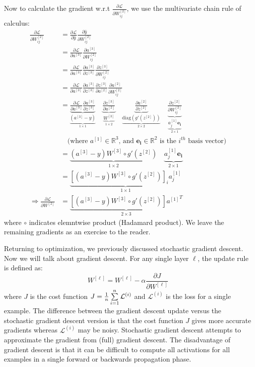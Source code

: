 \documentclass{article}
\numberwithin{equation}{section}
\begin{document}
Now to calculate the gradient w.r.t $\frac{\partial \mathcal{L}}{\partial W^{[2]}_{ij}}$, we use the multivariate chain rule of calculus:
\begin{align*}
\frac{\partial \mathcal{L}}{\partial W^{[2]}_{ij}} &= \frac{\partial \mathcal{L}}{\partial \hat{y}} \frac{\partial \hat{y}}{\partial W^{[2]}_{ij}} \\
&= \frac{\partial \mathcal{L}}{\partial a^{[3]}} \frac{\partial a^{[3]}}{\partial W^{[2]}_{ij}} \\
&= \frac{\partial \mathcal{L}}{\partial a^{[3]}} \frac{\partial a^{[3]}}{\partial z^{[3]}} \frac{\partial z^{[3]}}{\partial W^{[2]}_{ij}} \\
&= \frac{\partial \mathcal{L}}{\partial a^{[3]}} \frac{\partial a^{[3]}}{\partial z^{[3]}} \frac{\partial z^{[3]}}{\partial a^{[2]}} \frac{\partial a^{[2]}}{\partial W^{[2]}_{ij}} \\
&= \underbrace{\frac{\partial \mathcal{L}}{\partial a^{[3]}}  \frac{\partial a^{[3]}}{\partial z^{[3]}} }_{ \underbrace{(a^{[3]}-y)}_{1\times 1} } \quad \underbrace{ \frac{\partial z^{[3]}}{\partial a^{[2]}} }_{ \underbrace{ W^{[3]} }_{1\times 2} } \quad \underbrace{ \frac{\partial a^{[2]}}{\partial z^{[2]}} }_{ \underbrace{\text{diag} \left(g'(z^{[2]})\right)  }_{2\times 2} } \quad \underbrace{\frac{\partial z^{[2]}} {\partial W^{[2]}_{ij}}}_{\underbrace{a^{[1]}_j\mathbf{e_i} }_{2\times 1} } \\
&\quad\text{(where $a^{[1]} \in \mathbb{R}^3$, and $\mathbf{e_i} \in \mathbb{R}^2$ is the $i^{th}$ basis vector)} \\
&= \underbrace{ (a^{[3]}-y) W^{[3]} \circ g'(z^{[2]}) }_{1\times 2} \quad \underbrace{a^{[1]}_j\mathbf{e_i} }_{2\times 1}  \\
&= \underbrace{ \left[(a^{[3]}-y) W^{[3]} \circ g'(z^{[2]})\right]_i a^{[1]}_j }_{1\times 1} \\
\Rightarrow \frac{\partial \mathcal{L}}{\partial W^{[2]}} &= \underbrace{ \left[(a^{[3]}-y) W^{[3]} \circ g'(z^{[2]})\right] {a^{[1]}}^T }_{2\times 3}
\end{align*}
where $\circ$ indicates elemntwise product (Hadamard product). We leave the remaining gradients as an exercise to the reader.

Returning to optimization, we previously discussed stochastic gradient descent. Now we will talk about gradient descent.
For any single layer $\ell$, the update rule is defined as:
\begin{equation}
W^{[\ell]} = W^{[\ell]} - \alpha \frac{\partial J}{\partial W^{[\ell]}}
\end{equation}
where $J$ is the cost function $J = \frac{1}{{n}} \sum\limits_{i=1}^{{n}} \mathcal{L}^{(i)}$ and $\mathcal{L}^{(i)}$ is the loss for a single example.
The difference between the gradient descent update versus the stochastic gradient descent version is that the cost function $J$ gives more accurate gradients whereas $\mathcal{L}^{(i)}$ may be noisy.
Stochastic gradient descent attempts to approximate the gradient from (full) gradient descent.
The disadvantage of gradient descent is that it can be difficult to compute all activations for all examples in a single forward or backwards propagation phase.
\end{document}
